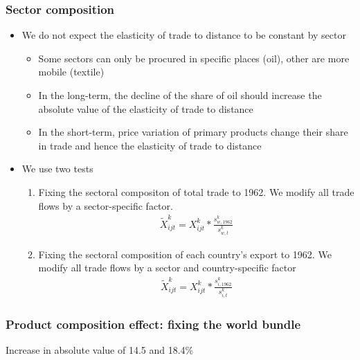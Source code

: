 \documentclass{beamer}
\begin{document}
\begin{frame}[plain]\frametitle{Sector composition}

\begin{itemize}
	\item We do not expect the elasticity of trade to distance to be constant by sector
	\begin{itemize}
		\item Some sectors can only be procured in specific places (oil), other are more mobile (textile)
		\item In the long-term, the decline of the share of oil should increase the absolute value of the elasticity of trade to distance
		\item In the short-term, price variation of primary products change their share in trade and hence the elasticity of trade to distance
	\end{itemize}
	\item We use two tests
	\begin{enumerate}
		\item Fixing the sectoral compositon of total trade to 1962. We modify all trade flows by a sector-specific factor.
		\begin{eqnarray}
		\tilde{X}^k_{ijt}=X^k_{ijt}*\frac{s^k_{w,1962}}{s^k_{w,t}} \nonumber
		\end{eqnarray}
		\item Fixing the sectoral composition of each country's export to 1962. We modify all trade flows by a sector and country-specific factor
		\begin{eqnarray}
		\tilde{X}^k_{ijt}=X^k_{ijt}*\frac{s^k_{i,1962}}{s^k_{i,t}} \nonumber
		\end{eqnarray}
	\end{enumerate}
\end{itemize}

\end{frame}

\begin{frame}[plain]\frametitle{Product composition effect: fixing the world bundle}
	\begin{figure}[h!]
		\begin{center}
			\setlength{\fboxrule}{1pt} %
			\setlength{\fboxsep}{.1in} %
		\end{center}
	\end{figure}
	Increase in absolute value of 14.5 and 18.4\%
\end{frame}
\end{document}

